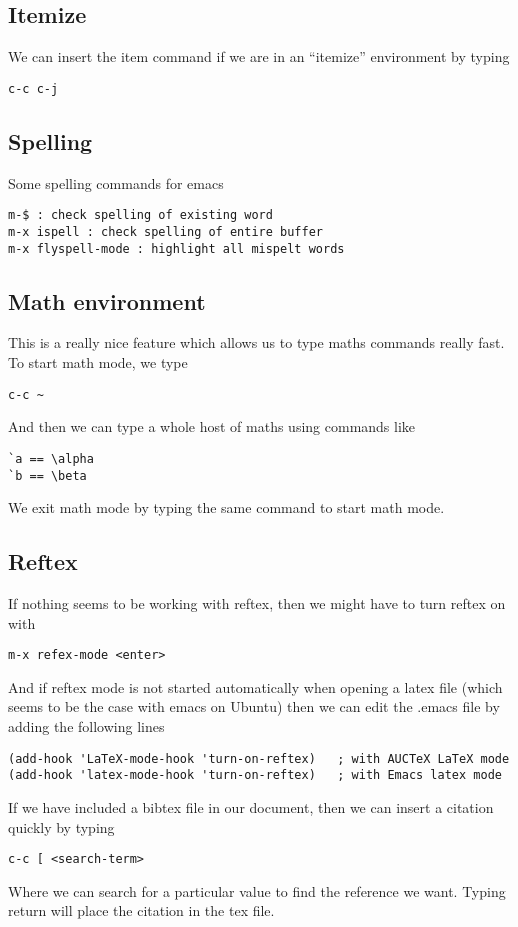 \documentclass[a4paper, 10pt]{article}
\begin{document}
\subsection{Itemize}
\label{sec:itemize}


We can insert the item command if we are in an ``itemize'' environment
by typing
\begin{verbatim}
c-c c-j
\end{verbatim}


\subsection{Spelling}
\label{sec:spelling}

Some spelling commands for emacs
\begin{verbatim}
m-$ : check spelling of existing word
m-x ispell : check spelling of entire buffer
m-x flyspell-mode : highlight all mispelt words
\end{verbatim}

\subsection*{Math environment}
This is a really nice feature which allows us to type maths commands really fast. To start math mode, we type
\begin{verbatim}
c-c ~
\end{verbatim}
And then we can type a whole host of maths using commands like
\begin{verbatim}
`a == \alpha
`b == \beta
\end{verbatim}

We exit math mode by typing the same command to start math mode.

\subsection*{Reftex}

If nothing seems to be working with reftex, then we might have to turn
reftex on with 
\begin{verbatim}
m-x refex-mode <enter>
\end{verbatim}
And if reftex mode is not started automatically when opening a latex
file (which seems to be the case with emacs on Ubuntu) then we can
edit the .emacs file by adding the following lines
\begin{verbatim}
(add-hook 'LaTeX-mode-hook 'turn-on-reftex)   ; with AUCTeX LaTeX mode
(add-hook 'latex-mode-hook 'turn-on-reftex)   ; with Emacs latex mode
\end{verbatim}
If we have included a bibtex file in our document, then we can insert a citation quickly by typing
\begin{verbatim}
c-c [ <search-term>
\end{verbatim}
Where we can search for a particular value to find the reference we want. Typing return will place the citation in the tex file.
  
\end{document}
